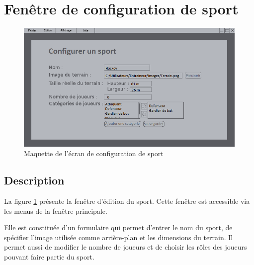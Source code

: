 \section{Fenêtre de configuration de sport}

\begin{figure}[H]
	\centering
	\includegraphics[width=\textwidth]{mockup/mockupSport.png}
	\caption{Maquette de l'écran de configuration de sport}
	\label{fig:mock-up-sport}
\end{figure}

\subsection{Description}

La figure \ref{fig:mock-up-sport} présente la fenêtre d'édition du sport. Cette fenêtre est accessible via les menus de la fenêtre principale.

Elle est constituée d'un formulaire qui permet d'entrer le nom du sport, de spécifier l'image utilisée comme arrière-plan et les dimensions du terrain. Il permet aussi de modifier le nombre de joueurs et de choisir les rôles des joueurs pouvant faire partie du sport.